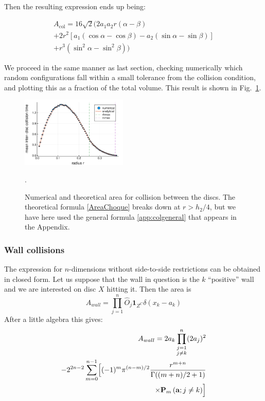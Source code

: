 \documentclass[superscriptaddress,pre,reprint,showpacs,twocolumn]{revtex4-1}
\newcommand{\sumprod}[1]{\mathbf{P}_{#1} \,}
\begin{document}
Then the resulting expression ends up being:
 
\begin{equation}\label{colgeneral}
  \begin{split}
  A_\text{col}  = 16\sqrt{2} \bigl( 2a_1a_2r(\alpha-\beta)
 \\ + 2r^2 [a_1 (\cos \alpha-\cos\beta) -a_2 (\sin\alpha -\sin\beta)]
 \\ + r^3(\sin^2 \alpha -\sin^2\beta) \bigr)
  \end{split}
\end{equation}
 

We proceed in the same manner as last section, checking numerically which
random configurations
fall within a small tolerance from the collision condition, and
plotting this as a fraction of the total volume.
This result is shown in Fig.~\ref{AreaChoqueTeoyNum}. 
\begin{figure}
\centering
\includegraphics[width=0.45\textwidth]{./figures/areaCol01.pdf}
\caption{Numerical and theoretical area 
for collision between the discs.  The theoretical formula 
\eqref{AreaChoque} breaks down at
$r > h_2/4$, but we have here used the general formula \eqref{app:colgeneral}
that appears in the Appendix.}
\label{AreaChoqueTeoyNum}.
\end{figure}


\subsubsection{Wall collisions}

The expression for $n$-dimensions without side-to-side restrictions can
be obtained in closed form. Let us suppose that the wall in question
is the $k$ ``positive'' wall and we are interested on disc $X$ hitting
it. Then the area is
\begin{equation}
A_{wall} = \prod_{j=1}^n \hat{O}_j \mathbf{1}_{Z^C} \delta(x_k-a_k)
\end{equation}
After a little algebra this gives:
\begin{equation}
  \begin{split}
    A_{wall} = 2a_k\prod_{ \substack{ j=1\\ j\neq k}}^n (2a_j)^2
    \\ - 2^{2n-2} \sum_{m=0}^{n-1} \Bigr[
      (-1)^m \pi^{ (n-m)/2} \frac{r^{m+n}}{\Gamma((m+n)/2+1)}
    \\  \times 
  \sumprod{m} (\mathbf{a}; j\neq k) \Bigl]
  \end{split}
  \end{equation}
\end{document}
